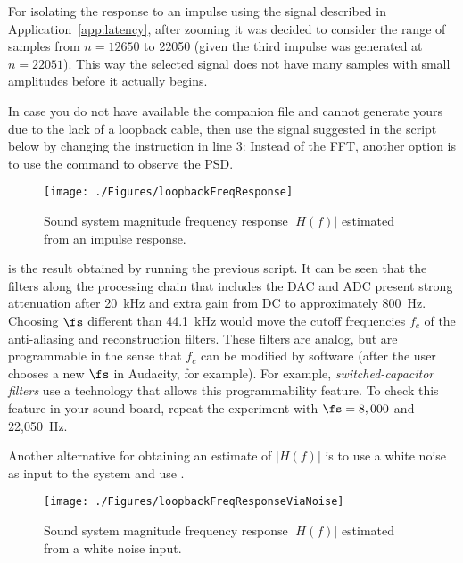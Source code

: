For isolating the response to an impulse using the signal described in Application~\ref{app:latency}, 
after zooming  it was decided to consider the range of samples from $n=12650$ to 22050 (given the third impulse was generated at $n=22051$). This way the selected signal does not have many samples with small amplitudes before it actually begins.

In case you do not have available the companion file  and cannot generate yours due to the lack of a loopback cable, then use the signal suggested in the script below by changing the  instruction in line 3:
Instead of the FFT, another option is to use
the command  to observe the PSD.

\begin{figure}
\centering
\texttt{[image: ./Figures/loopbackFreqResponse]}
\caption{Sound system magnitude frequency response $|H(f)|$ estimated from an impulse response.\label{fig:loopbackFreqResponse}}
\end{figure}

 is the result obtained by running the previous script. It can
be seen that the filters along the processing chain that includes the DAC and ADC 
present strong attenuation after 20~kHz and extra gain from DC to approximately 800~Hz.
Choosing $\fs$ different than 44.1~kHz would move the cutoff frequencies $f_c$ of the anti-aliasing and reconstruction filters.
These filters are analog, but are programmable in the sense that $f_c$ can be modified by software (after the user chooses a new $\fs$ in Audacity, for example). For example, \emph{switched-capacitor filters} use a technology that allows this programmability feature. To check this feature in your sound board, repeat the experiment with $\fs=8,000$ and 22,050~Hz.

Another alternative for obtaining an estimate of $|H(f)|$ is to use a white noise as input to the system and use
.

\begin{figure}
\centering
\texttt{[image: ./Figures/loopbackFreqResponseViaNoise]}
\caption{Sound system magnitude frequency response $|H(f)|$ estimated from a white noise input.\label{fig:loopbackFreqResponseViaNoise}}
\end{figure}

